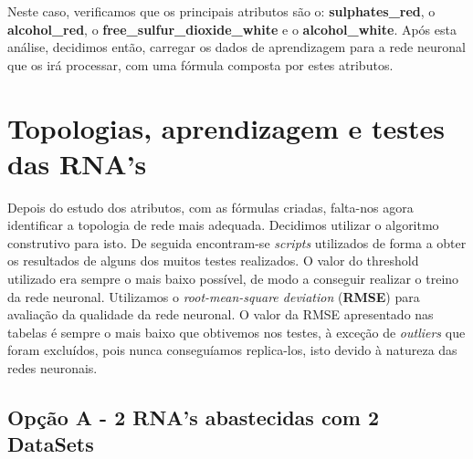 \documentclass{report}
\begin{document}
Neste caso, verificamos que os principais atributos são o: \textbf{sulphates\_red}, o \textbf{alcohol\_red}, o \textbf{free\_sulfur\_dioxide\_white} e o \textbf{alcohol\_white}. Após esta análise, decidimos então, carregar os dados de aprendizagem para a rede neuronal que os irá processar, com uma fórmula composta por estes atributos.














































\chapter{Topologias, aprendizagem e testes das RNA's}

Depois do estudo dos atributos, com as fórmulas criadas, falta-nos agora identificar a topologia de rede mais adequada. Decidimos utilizar o algoritmo construtivo para isto. De seguida encontram-se \textit{scripts} utilizados de forma a obter os resultados de alguns dos muitos testes realizados. O valor do threshold utilizado era sempre o mais baixo possível, de modo a conseguir realizar o treino da rede neuronal. Utilizamos o \textit{root-mean-square deviation} (\textbf{RMSE}) para avaliação da qualidade da rede neuronal. O valor da RMSE apresentado nas tabelas é sempre o mais baixo que obtivemos nos testes, à exceção de \textit{outliers} que foram excluídos, pois nunca conseguíamos replica-los, isto devido à natureza das redes neuronais.

\section{Opção A - 2 RNA's abastecidas com 2 DataSets}
\end{document}
